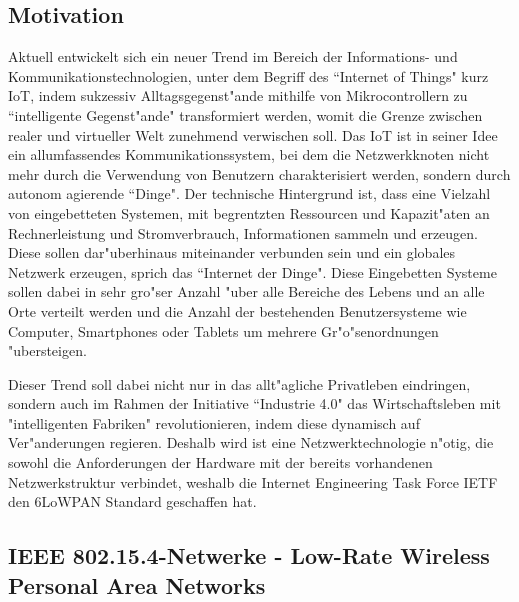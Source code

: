 \documentclass[final]{lktseminar}
\begin{document}
\subsection{Motivation}
\label{sec: Motivation}
Aktuell entwickelt sich ein neuer Trend im Bereich der Informations- und Kommunikationstechnologien, unter dem Begriff des
``Internet of Things" kurz IoT, indem sukzessiv Alltagsgegenst"ande mithilfe von Mikrocontrollern zu
``intelligente Gegenst"ande" transformiert werden, womit die Grenze zwischen realer und virtueller Welt zunehmend verwischen soll.
Das IoT ist in seiner Idee ein allumfassendes Kommunikationssystem, bei dem die Netzwerkknoten nicht mehr durch die
Verwendung von Benutzern charakterisiert werden, sondern durch autonom agierende ``Dinge".
Der technische Hintergrund ist, dass eine Vielzahl von eingebetteten Systemen, mit begrentzten Ressourcen und Kapazit"aten
 an Rechnerleistung und Stromverbrauch, Informationen sammeln und erzeugen. Diese sollen dar"uberhinaus
miteinander verbunden sein und ein globales Netzwerk erzeugen, sprich das ``Internet der Dinge".
Diese Eingebetten Systeme sollen dabei in sehr gro"ser Anzahl "uber alle Bereiche des Lebens und an alle Orte verteilt werden
und die Anzahl der bestehenden Benutzersysteme wie Computer, Smartphones oder Tablets um mehrere Gr"o"senordnungen
"ubersteigen.

Dieser Trend soll dabei nicht nur in das allt"agliche Privatleben eindringen, sondern auch im Rahmen der Initiative
``Industrie 4.0" das Wirtschaftsleben mit "intelligenten Fabriken" revolutionieren, indem diese dynamisch auf Ver"anderungen
regieren. Deshalb wird ist eine Netzwerktechnologie n"otig, die sowohl die Anforderungen der Hardware mit der
bereits vorhandenen Netzwerkstruktur verbindet, weshalb die Internet Engineering Task Force IETF den 6LoWPAN Standard
geschaffen hat.


\subsection{IEEE 802.15.4-Netwerke - Low-Rate Wireless Personal Area Networks}
\label{sec: 802.15.4-Netwerke - Low-Rate Wireless Personal Area Networks}
\end{document}
